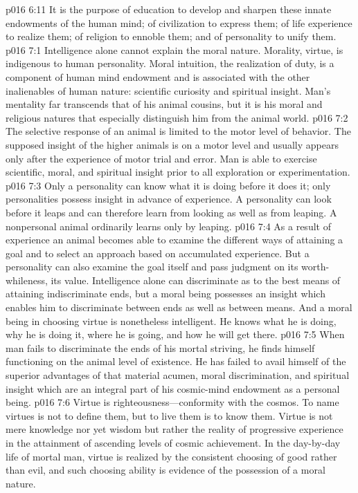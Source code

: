 \vs p016 6:11 It is the purpose of education to develop and sharpen these innate endowments of the human mind; of civilization to express them; of life experience to realize them; of religion to ennoble them; and of personality to unify them.
%
\vs p016 7:1 Intelligence alone cannot explain the moral nature. Morality, virtue, is indigenous to human personality. Moral intuition, the realization of duty, is a component of human mind endowment and is associated with the other inalienables of human nature: scientific curiosity and spiritual insight. Man’s mentality far transcends that of his animal cousins, but it is his moral and religious natures that especially distinguish him from the animal world.
\vs p016 7:2 The selective response of an animal is limited to the motor level of behavior. The supposed insight of the higher animals is on a motor level and usually appears only after the experience of motor trial and error. Man is able to exercise scientific, moral, and spiritual insight prior to all exploration or experimentation.
\vs p016 7:3 Only a personality can know what it is doing before it does it; only personalities possess insight in advance of experience. A personality can look before it leaps and can therefore learn from looking as well as from leaping. A nonpersonal animal ordinarily learns only by leaping.
\vs p016 7:4 As a result of experience an animal becomes able to examine the different ways of attaining a goal and to select an approach based on accumulated experience. But a personality can also examine the goal itself and pass judgment on its worth\hyp{}whileness, its value. Intelligence alone can discriminate as to the best means of attaining indiscriminate ends, but a moral being possesses an insight which enables him to discriminate between ends as well as between means. And a moral being in choosing virtue is nonetheless intelligent. He knows what he is doing, why he is doing it, where he is going, and how he will get there.
\vs p016 7:5 When man fails to discriminate the ends of his mortal striving, he finds himself functioning on the animal level of existence. He has failed to avail himself of the superior advantages of that material acumen, moral discrimination, and spiritual insight which are an integral part of his cosmic\hyp{}mind endowment as a personal being.
\pc \vs p016 7:6 Virtue is righteousness---conformity with the cosmos. To name virtues is not to define them, but to live them is to know them. Virtue is not mere knowledge nor yet wisdom but rather the reality of progressive experience in the attainment of ascending levels of cosmic achievement. In the day\hyp{}by\hyp{}day life of mortal man, virtue is realized by the consistent choosing of good rather than evil, and such choosing ability is evidence of the possession of a moral nature.
